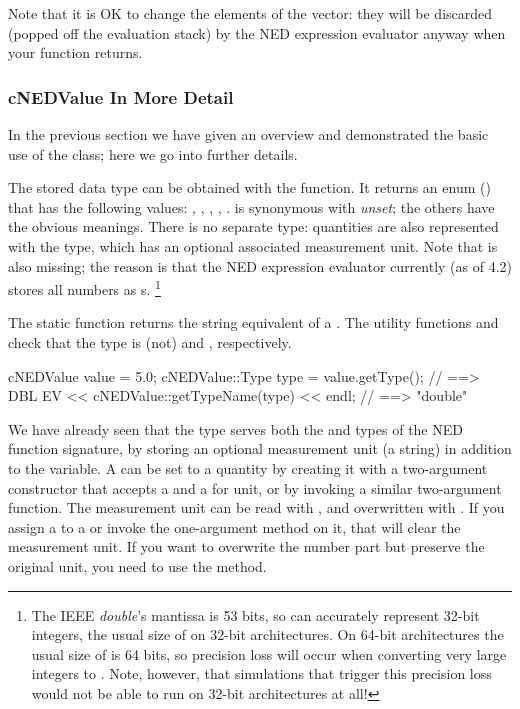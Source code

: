 \begin{note}
Note that it is OK to change the elements of the  vector: they
will be discarded (popped off the evaluation stack) by the NED expression
evaluator anyway when your function returns.
\end{note}


\subsubsection{cNEDValue In More Detail}
\label{sec:sim-lib:cnedvalue-in-more-detail}

In the previous section we have given an overview and demonstrated the basic
use of the  class; here we go into further details.

The stored data type can be obtained with the  function.
It returns an enum () that has the following values:
, , , , .  is
synonymous with \textit{unset}; the others have the obvious meanings. There
is no separate  type: quantities are also represented with
the  type, which has an optional associated measurement unit. Note
that  is also missing; the reason is that the NED expression
evaluator currently (as of {\opp} 4.2) stores all numbers as s.
  \footnote{The IEEE \textit{double}'s mantissa is 53 bits, so 
  can accurately represent 32-bit integers, the usual size of  on
  32-bit architectures. On 64-bit architectures the usual size of 
  is 64 bits, so precision loss will occur when converting very large integers
  to . Note, however, that simulations that trigger this precision
  loss would not be able to run on 32-bit architectures at all!}

The  static function returns the string equivalent of
a . The utility functions  and
 check that the type is (not)  and ,
respectively.

\begin{cpp}
cNEDValue value = 5.0;
cNEDValue::Type type = value.getType(); // ==> DBL
EV << cNEDValue::getTypeName(type) << endl; // ==> "double"
\end{cpp}

We have already seen that the  type serves both the
 and  types of the NED function
signature, by storing an optional measurement unit (a string)
in addition to the  variable. A  can be set
to a quantity by creating it with a two-argument constructor that accepts
a  and a  for unit, or by invoking a similar
two-argument  function. The measurement unit can be read with
, and overwritten with . If you assign a
 to a  or invoke the one-argument
 method on it, that will clear the measurement unit. If you
want to overwrite the number part but preserve the original unit, you need
to use the  method.

